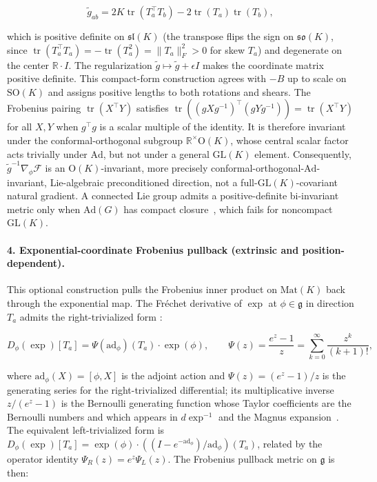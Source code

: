 \documentclass[twoside,11pt]{article}
\begin{document}
\begin{equation}
\tilde{g}_{ab} = 2K \operatorname{tr}(T_a^\top T_b) - 2\operatorname{tr}(T_a)\operatorname{tr}(T_b),
\label{eq:killing_metric}
\end{equation}

which is positive definite on $\mathfrak{sl}(K)$ (the transpose flips the sign on $\mathfrak{so}(K)$, since $\operatorname{tr}(T_a^\top T_a) = -\operatorname{tr}(T_a^2) = \|T_a\|_F^2 > 0$ for skew $T_a$) and degenerate on the center $\mathbb{R} \cdot I$. The regularization $\tilde{g} \mapsto \tilde{g} + \epsilon I$ makes the coordinate matrix positive definite. This compact-form construction agrees with $-B$ up to scale on $\mathrm{SO}(K)$ and assigns positive lengths to both rotations and shears. The Frobenius pairing $\operatorname{tr}(X^\top Y)$ satisfies $\operatorname{tr}((gXg^{-1})^\top(gYg^{-1})) = \operatorname{tr}(X^\top Y)$ for all $X,Y$ when $g^\top g$ is a scalar multiple of the identity. It is therefore invariant under the conformal-orthogonal subgroup $\mathbb{R}^{\times}\mathrm{O}(K)$, whose central scalar factor acts trivially under $\mathrm{Ad}$, but not under a general $\mathrm{GL}(K)$ element. Consequently, $\tilde{g}^{-1}\nabla_\phi\mathcal{F}$ is an $\mathrm{O}(K)$-invariant, more precisely conformal-orthogonal-$\mathrm{Ad}$-invariant, Lie-algebraic preconditioned direction, not a full-$\mathrm{GL}(K)$-covariant natural gradient. A connected Lie group admits a positive-definite bi-invariant metric only when $\mathrm{Ad}(G)$ has compact closure~\citep{Milnor1976}, which fails for noncompact $\mathrm{GL}(K)$.

\paragraph{4. Exponential-coordinate Frobenius pullback (extrinsic and position-dependent).}
This optional construction pulls the Frobenius inner product on $\mathrm{Mat}(K)$ back through the exponential map. The Fr\'echet derivative of $\exp$ at $\phi \in \mathfrak{g}$ in direction $T_a$ admits the right-trivialized form \citep[\S2.7 / Theorem 5.4]{Hall2015}:

\begin{equation}
D_\phi(\exp)[T_a] = \Psi(\mathrm{ad}_\phi)(T_a) \cdot \exp(\phi), \qquad \Psi(z) = \frac{e^z - 1}{z} = \sum_{k=0}^{\infty} \frac{z^k}{(k+1)!},
\end{equation}

where $\mathrm{ad}_\phi(X) = [\phi, X]$ is the adjoint action and $\Psi(z) = (e^z - 1)/z$ is the generating series for the right-trivialized differential; its multiplicative inverse $z/(e^z-1)$ is the Bernoulli generating function whose Taylor coefficients are the Bernoulli numbers and which appears in $d\exp^{-1}$ and the Magnus expansion~\citep{Hall2015}. The equivalent left-trivialized form is $D_\phi(\exp)[T_a] = \exp(\phi) \cdot ((I - e^{-\mathrm{ad}_\phi})/\mathrm{ad}_\phi)(T_a)$, related by the operator identity $\Psi_R(z) = e^z \Psi_L(z)$. The Frobenius pullback metric on $\mathfrak{g}$ is then:
\end{document}
